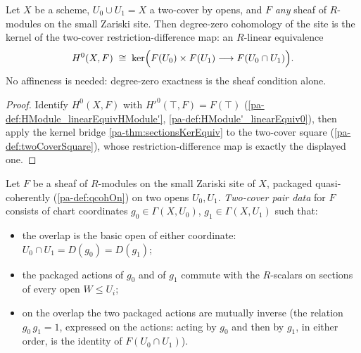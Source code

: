 \begin{theorem}
  \label{pa-thm:twoCoverH0LinearEquiv}
  \leanok

  Let \(X\) be a scheme, \(U_0 \cup U_1 = X\) a two-cover by opens, and \(F\) \emph{any}
  sheaf of \(R\)-modules on the small Zariski site. Then degree-zero cohomology of the
  site is the kernel of the two-cover restriction-difference map: an \(R\)-linear
  equivalence
  \[
    H^0(X, F) \;\cong\;
      \ker\Bigl(F(U_0) \times F(U_1) \longrightarrow F(U_0 \cap U_1)\Bigr).
  \]
  No affineness is needed: degree-zero exactness is the sheaf condition alone.
\end{theorem}
\begin{proof}
  \leanok
  Identify \(H^0(X, F)\) with \(H'^0(\top, F) = F(\top)\)
  (\ref{pa-def:HModule_linearEquivHModule'}, \ref{pa-def:HModule'_linearEquiv0}), then apply
  the kernel bridge \ref{pa-thm:sectionsKerEquiv} to the two-cover square
  (\ref{pa-def:twoCoverSquare}), whose restriction-difference map is exactly the displayed
  one.
\end{proof}

\begin{definition}
  \label{pa-def:twoCoverPairData}
  \leanok

  Let \(F\) be a sheaf of \(R\)-modules on the small Zariski site of \(X\), packaged
  quasi-coherently (\ref{pa-def:qcohOn}) on two opens \(U_0, U_1\). \emph{Two-cover pair
  data} for \(F\) consists of chart coordinates \(g_0 \in \Gamma(X, U_0)\),
  \(g_1 \in \Gamma(X, U_1)\) such that:
  \begin{itemize}
    \item the overlap is the basic open of either coordinate:
      \(U_0 \cap U_1 = D(g_0) = D(g_1)\);
    \item the packaged actions of \(g_0\) and of \(g_1\) commute with the \(R\)-scalars
      on sections of every open \(W \le U_i\);
    \item on the overlap the two packaged actions are mutually inverse (the relation
      \(g_0\, g_1 = 1\), expressed on the actions: acting by \(g_0\) and then by
      \(g_1\), in either order, is the identity of \(F(U_0 \cap U_1)\)).
  \end{itemize}
\end{definition}

